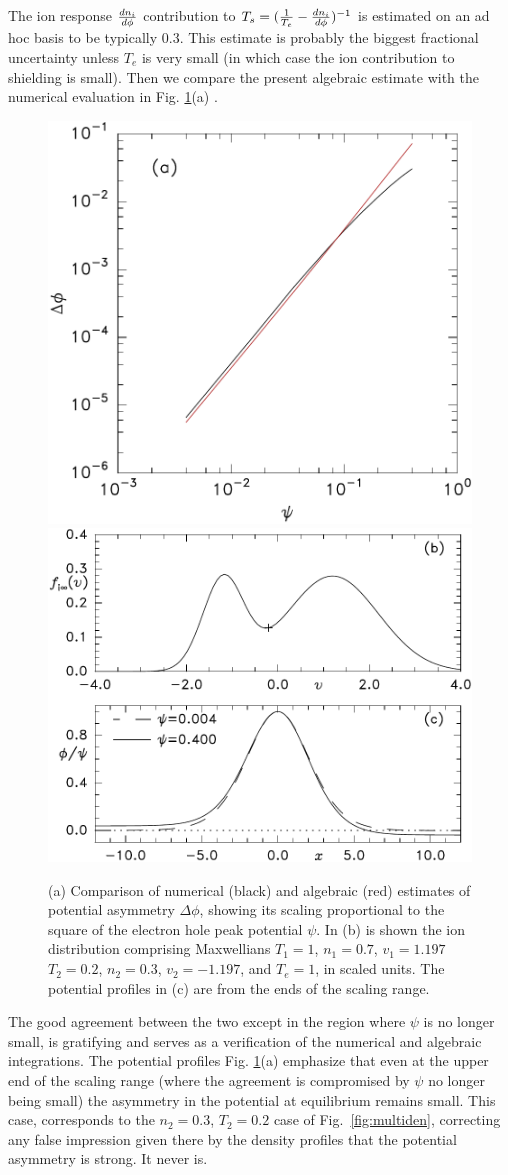 \documentclass[12pt]{article}
\begin{document}
The ion response ${dn_i\over d\phi}$ contribution to
$T_s= ({1\over T_e}-{dn_i\over d\phi})^{-1}$ is estimated on an ad hoc
basis to be typically $0.3$. This estimate is probably the biggest fractional
uncertainty unless $T_e$ is very small (in which case the ion
contribution to shielding is small). Then we compare the present
algebraic estimate with the numerical evaluation in
Fig. \ref{fig:scaled}(a) .
\begin{figure}[htp]
  \centering
  \includegraphics[width=0.42\hsize]{scaled}
  \includegraphics[width=0.5\hsize]{phiscaled}
  \caption{(a) Comparison of numerical (black) and algebraic (red)
    estimates of potential asymmetry $\Delta\phi$, showing its scaling
    proportional to the square of the electron hole peak potential
    $\psi$. In (b) is shown the ion distribution comprising Maxwellians $T_1=1$,
    $n_1=0.7$, $v_1=1.197$ $T_2=0.2$, $n_2=0.3$, $v_2=-1.197$, and
    $T_e=1$, in scaled units. The potential profiles in (c) are from the ends
    of the scaling range.}
  \label{fig:scaled}
\end{figure}
The good agreement between the two except in the region where $\psi$
is no longer small, is gratifying and serves as a verification of the
numerical and algebraic integrations. The potential profiles
Fig. \ref{fig:scaled}(a) emphasize that even at the upper end of the
scaling range (where the agreement is compromised by $\psi$ no longer
being small) the asymmetry in the potential at equilibrium remains
small. This case, corresponds to the $n_2=0.3$, $T_2=0.2$ case of
Fig.\ \ref{fig:multiden}, correcting any false impression given there
by the density profiles that the potential asymmetry is strong. It never is.
\end{document}
